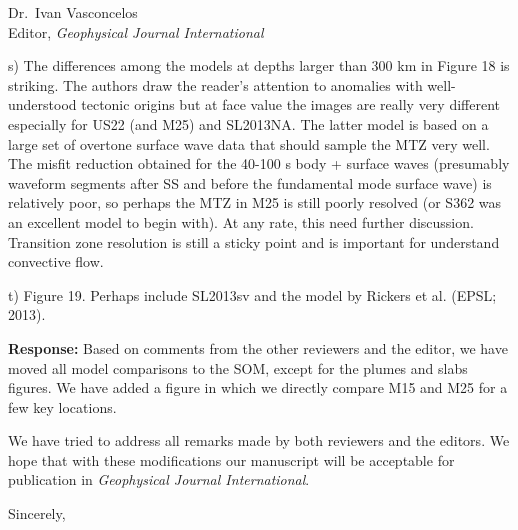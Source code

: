 \documentclass[11pt,a4paper]{letter}
\newcommand{\response}[1]{\textbf{Response:} #1}
\begin{document}
\begin{letter}{Dr.~Ivan Vasconcelos\\
Editor, \textit{Geophysical Journal International}}
{s) The differences among the models at depths larger than 300 km in Figure 18 is striking.
The authors draw the reader's attention to anomalies with well-understood tectonic origins but at face value the images are really very different especially for US22 (and M25) and SL2013NA.
The latter model is based on a large set of overtone surface wave data that should sample the MTZ very well. The misfit reduction obtained for the 40-100 s body + surface waves (presumably waveform segments after SS and before the fundamental mode surface wave) is relatively poor, so perhaps the MTZ in M25 is still poorly resolved (or S362 was an excellent model to begin with).
At any rate, this need further discussion. Transition zone resolution is still a sticky point and is important for understand convective flow.

t) Figure 19. Perhaps include SL2013sv and the model by Rickers et al. (EPSL; 2013).
}

\response{Based on comments from the other reviewers and the editor, we have moved
all model comparisons to the SOM, except for the plumes and slabs figures.
We have added a figure in which we directly compare M15 and M25 for a few key locations.}

We have tried to address all remarks made by both reviewers and the editors.
We hope that with these modifications our manuscript will be acceptable for publication in \textit{Geophysical Journal International}.

\closing{Sincerely,}

\end{letter} 
\end{document}
